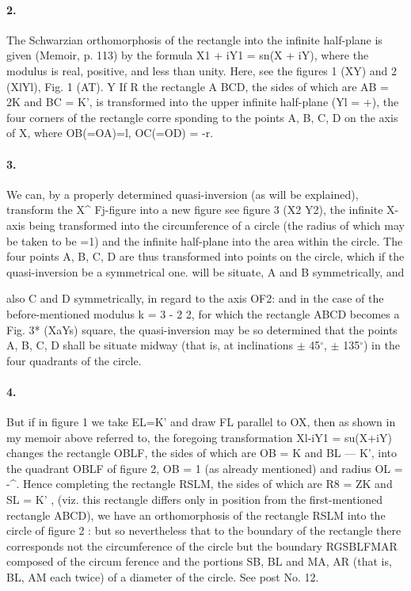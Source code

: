 \documentclass[11pt,a4paper]{book}
\begin{document}
{{{{\paragraph{2.} The  Schwarzian  orthomorphosis  of  the  rectangle  into  the  infinite  half-plane
is  given  (Memoir,  p.  113)  by  the  formula  X1  +  iY1  =  sn(X  +  iY),  where  the  modulus
is  real,  positive,  and  less  than  unity.  Here,  see  the  figures  1  (XY)  and  2  (XlYl),
Fig.  1  (AT).
Y
If
R
the  rectangle  A  BCD,  the  sides  of  which  are  AB  =  2K  and  BC  =  K',  is  transformed
into  the  upper  infinite  half-plane  (Yl  =  +),  the  four  corners  of  the  rectangle  corre
sponding  to  the  points  A,  B,  C,  D  on  the  axis  of  X,  where  OB(=OA)=l,  OC(=OD)  =  -r.
\paragraph{3.} We  can,  by  a  properly  determined  quasi-inversion  (as  will  be  explained),
transform  the  X^  Fj-figure  into  a  new  figure  see  figure  3  (X2  Y2),  the  infinite  X-axis
being  transformed  into  the  circumference  of  a  circle  (the  radius  of  which  may  be
taken  to  be  =1)  and  the  infinite  half-plane  into  the  area  within  the  circle.  The
four  points  A,  B,  C,  D  are  thus  transformed  into  points  on  the  circle,  which  if  the
quasi-inversion  be  a  symmetrical  one.  will  be  situate,  A  and  B  symmetrically,  and


also   C  and   D    symmetrically,    in    regard    to    the    axis    OF2:    and    in    the    case    of    the
before-mentioned    modulus    k  =  3  -  2  \/2,    for    which    the    rectangle    ABCD    becomes    a
Fig.  3*  (XaYs)
square,  the  quasi-inversion  may  be  so  determined  that  the  points  A,  B,  C,  D  shall
be  situate  midway  (that  is,  at  inclinations  $\pm$  45$^\circ$,  $\pm$  135$^\circ$)  in  the  four  quadrants  of
the  circle.
\paragraph{4.} But   if  in   figure    1    we    take  EL=K'   and   draw  FL   parallel   to   OX,   then  as
shown  in  my  memoir  above  referred  to,  the  foregoing  transformation  Xl-\-iY1  =  su(X+iY)
changes  the  rectangle   OBLF,   the  sides  of  which   are    OB  =  K  and   BL  ---  K',   into  the
quadrant    OBLF    of    figure    2,    OB  =  1    (as    already    mentioned)    and    radius    OL  =  -^.
Hence  completing  the  rectangle  RSLM,  the  sides  of  which  are  R8  =  ZK  and  SL  =  K' ,
(viz.  this  rectangle  differs  only  in  position  from  the  first-mentioned  rectangle  ABCD),
we  have  an  orthomorphosis  of  the  rectangle  RSLM  into  the  circle  of  figure  2 :  but
so  nevertheless  that  to  the  boundary  of  the  rectangle  there  corresponds  not  the
circumference  of  the  circle  but  the  boundary  RGSBLFMAR  composed  of  the  circum
ference  and  the  portions  SB,  BL  and  MA,  AR  (that  is,  BL,  AM  each  twice)  of  a
diameter  of  the  circle.  See  post  No.  12.
}}}}
\end{document}

